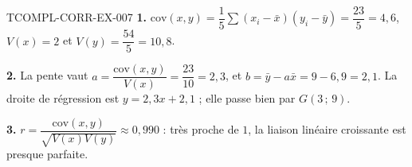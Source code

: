 \begin{corrige}{TCOMPL-CORR-EX-007}
\textbf{1.} $\mathrm{cov}(x,y)=\dfrac{1}{5}\sum(x_i-\bar x)(y_i-\bar y)
=\dfrac{23}{5}=4{,}6$, $V(x)=2$ et $V(y)=\dfrac{54}{5}=10{,}8$.

\textbf{2.} La pente vaut $a=\dfrac{\mathrm{cov}(x,y)}{V(x)}
=\dfrac{23}{10}=2{,}3$, et $b=\bar y-a\bar x=9-6{,}9=2{,}1$. La droite de
régression est $y=2{,}3x+2{,}1$ ; elle passe bien par $G(3\,;\,9)$.

\textbf{3.} $r=\dfrac{\mathrm{cov}(x,y)}{\sqrt{V(x)V(y)}}\approx0{,}990$ :
très proche de $1$, la liaison linéaire croissante est presque parfaite.
\end{corrige}

